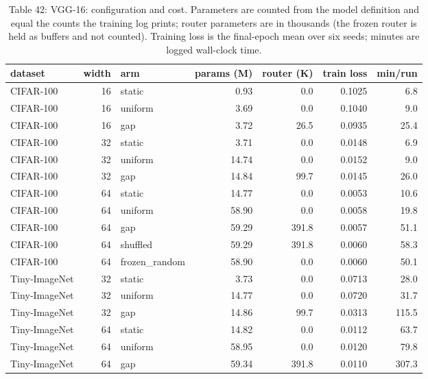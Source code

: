 \documentclass{article}
\begin{document}
\begin{table}
\caption{Table 42: VGG-16: configuration and cost. Parameters are counted from the
model definition and equal the counts the training log prints; router
parameters are in thousands (the frozen router is held as buffers and not
counted). Training loss is the final-epoch mean over six seeds; minutes
are logged wall-clock time.}

\begin{tabular}{l r l rr r r}
\toprule
dataset & width & arm & params (M) & router (K) & train loss & min/run \\
\midrule
CIFAR‑100 & 16 & static & 0.93 & 0.0 & 0.1025 & 6.8 \\
CIFAR‑100 & 16 & uniform & 3.69 & 0.0 & 0.1040 & 9.0 \\
CIFAR‑100 & 16 & gap & 3.72 & 26.5 & 0.0935 & 25.4 \\
CIFAR‑100 & 32 & static & 3.71 & 0.0 & 0.0148 & 6.9 \\
CIFAR‑100 & 32 & uniform & 14.74 & 0.0 & 0.0152 & 9.0 \\
CIFAR‑100 & 32 & gap & 14.84 & 99.7 & 0.0145 & 26.0 \\
CIFAR‑100 & 64 & static & 14.77 & 0.0 & 0.0053 & 10.6 \\
CIFAR‑100 & 64 & uniform & 58.90 & 0.0 & 0.0058 & 19.8 \\
CIFAR‑100 & 64 & gap & 59.29 & 391.8 & 0.0057 & 51.1 \\
CIFAR‑100 & 64 & shuffled & 59.29 & 391.8 & 0.0060 & 58.3 \\
CIFAR‑100 & 64 & frozen\_random & 58.90 & 0.0 & 0.0060 & 50.1 \\
Tiny‑ImageNet & 32 & static & 3.73 & 0.0 & 0.0713 & 28.0 \\
Tiny‑ImageNet & 32 & uniform & 14.77 & 0.0 & 0.0720 & 31.7 \\
Tiny‑ImageNet & 32 & gap & 14.86 & 99.7 & 0.0313 & 115.5 \\
Tiny‑ImageNet & 64 & static & 14.82 & 0.0 & 0.0112 & 63.7 \\
Tiny‑ImageNet & 64 & uniform & 58.95 & 0.0 & 0.0120 & 79.8 \\
Tiny‑ImageNet & 64 & gap & 59.34 & 391.8 & 0.0110 & 307.3 \\
\bottomrule
\end{tabular}
\end{table}
\end{document}
